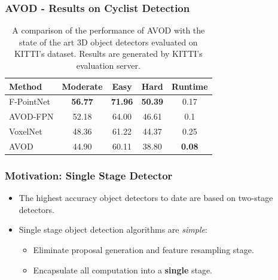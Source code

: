 \documentclass[10pt,fleqn,unknownkeysallowed]{beamer}
\begin{document}
\begin{frame}
	\frametitle{AVOD - Results on Cyclist Detection}
	\begin{table}
		\begin{tabular}{l | c | c | c | c }
			Method & Moderate & Easy & Hard & Runtime \\
			\hline \hline
			F-PointNet & \textbf{56.77} & \textbf{71.96} & \textbf{50.39}  & 0.17 \\
			AVOD-FPN & 52.18 & 64.00 & 46.61 & 0.1 \\
			VoxelNet & 48.36 & 61.22 & 44.37 & 0.25 \\ 
			AVOD & 44.90  & 60.11 & 38.80 & \textbf{0.08} \\
		\end{tabular}
		\caption{A comparison of the performance of AVOD with the state of the art 3D object detectors evaluated on KITTI's dataset. Results are generated by KITTI's evaluation server.}
	\end{table}
\end{frame}


\begin{frame}
	\frametitle{Motivation: Single Stage Detector}
	\linespread{1.5}
	\begin{itemize}
		\item{The highest accuracy object detectors to date are based on two-stage detectors.}
		\item{Single stage object detection algorithms are \textit{simple}:}
		\begin{itemize}
			\item{Eliminate proposal generation and feature resampling stage.}
			\item{Encapsulate all computation into a \textbf{single} stage.}
		\end{itemize}
	\end{itemize}
\end{frame}
\end{document}

